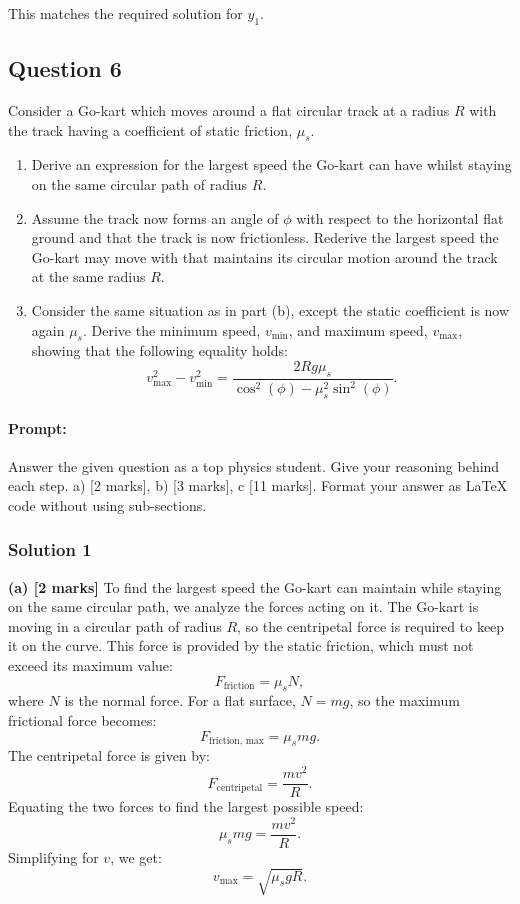 \documentclass{article}
\begin{document}
This matches the required solution for $y_1$.

\subsection{Question 6}

Consider a Go-kart which moves around a flat circular track at a radius $R$ with the track having a coefficient of static friction, $\mu_s$.

\begin{enumerate}
    \item[(a)] Derive an expression for the largest speed the Go-kart can have whilst staying on the same circular path of radius $R$.
    
    \item[(b)] Assume the track now forms an angle of $\phi$ with respect to the horizontal flat ground and that the track is now frictionless. Rederive the largest speed the Go-kart may move with that maintains its circular motion around the track at the same radius $R$.
    
    \item[(c)] Consider the same situation as in part (b), except the static coefficient is now again $\mu_s$. Derive the minimum speed, $v_{\text{min}}$, and maximum speed, $v_{\text{max}}$, showing that the following equality holds:
    \[
    v^2_{\text{max}} - v^2_{\text{min}} = \frac{2R g \mu_s}{\cos^2(\phi) - \mu_s^2 \sin^2(\phi)}.
    \]
\end{enumerate}

\paragraph{Prompt: \\} 
Answer the given question as a top physics student. Give your reasoning behind each step. a) [2 marks], b) [3 marks], c [11 marks].
Format your answer as LaTeX code without using sub-sections.


\subsubsection{Solution 1}
\textbf{(a) [2 marks]}  
To find the largest speed the Go-kart can maintain while staying on the same circular path, we analyze the forces acting on it. The Go-kart is moving in a circular path of radius $R$, so the centripetal force is required to keep it on the curve. This force is provided by the static friction, which must not exceed its maximum value:
\[
F_{\text{friction}} = \mu_s N,
\]
where $N$ is the normal force. For a flat surface, $N = mg$, so the maximum frictional force becomes:
\[
F_{\text{friction, max}} = \mu_s mg.
\]
The centripetal force is given by:
\[
F_{\text{centripetal}} = \frac{mv^2}{R}.
\]
Equating the two forces to find the largest possible speed:
\[
\mu_s mg = \frac{mv^2}{R}.
\]
Simplifying for $v$, we get:
\[
v_{\text{max}} = \sqrt{\mu_s g R}.
\]
\end{document}
